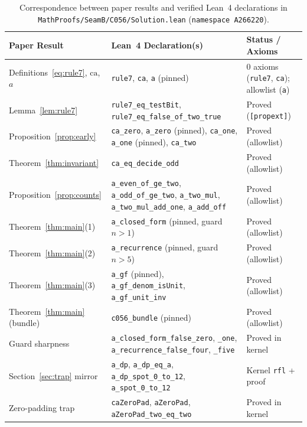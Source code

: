 \documentclass[11pt]{article}
\theoremstyle{definition}
\newcommand{\ca}{\mathrm{ca}}
\begin{document}
\begin{table}[ht]
\centering
\caption{Correspondence between paper results and verified Lean~4 declarations in \texttt{MathProofs/SeamB/C056/Solution.lean} (\texttt{namespace A266220}).}
\label{tab:lean-map}
\smallskip
{\small
\begin{tabular}{@{}l >{\raggedright\arraybackslash}p{6.5cm} >{\raggedright\arraybackslash}p{4.3cm}@{}}
\toprule
Paper Result & Lean~4 Declaration(s) & Status / Axioms \\
\midrule
Definitions~\eqref{eq:rule7}, $\ca$, $a$ & \texttt{rule7}, \texttt{ca}, \texttt{a} (pinned) & $0$ axioms (\texttt{rule7}, \texttt{ca}); allowlist (\texttt{a}) \\
Lemma~\ref{lem:rule7} & \texttt{rule7\_eq\_testBit}, \texttt{rule7\_eq\_false\_of\_two\_true} & Proved (\texttt{[propext]}) \\
Proposition~\ref{prop:early} & \texttt{ca\_zero}, \texttt{a\_zero} (pinned), \texttt{ca\_one}, \texttt{a\_one} (pinned), \texttt{ca\_two} & Proved (allowlist) \\
Theorem~\ref{thm:invariant} & \texttt{ca\_eq\_decide\_odd} & Proved (allowlist) \\
Proposition~\ref{prop:counts} & \texttt{a\_even\_of\_ge\_two}, \texttt{a\_odd\_of\_ge\_two}, \texttt{a\_two\_mul}, \texttt{a\_two\_mul\_add\_one}, \texttt{a\_add\_off} & Proved (allowlist) \\
Theorem~\ref{thm:main}(1) & \texttt{a\_closed\_form} (pinned, guard $n > 1$) & Proved (allowlist) \\
Theorem~\ref{thm:main}(2) & \texttt{a\_recurrence} (pinned, guard $n > 5$) & Proved (allowlist) \\
Theorem~\ref{thm:main}(3) & \texttt{a\_gf} (pinned), \texttt{a\_gf\_denom\_isUnit}, \texttt{a\_gf\_unit\_inv} & Proved (allowlist) \\
Theorem~\ref{thm:main} (bundle) & \texttt{c056\_bundle} (pinned) & Proved (allowlist) \\
Guard sharpness & \texttt{a\_closed\_form\_false\_zero}, \texttt{\_one}, \texttt{a\_recurrence\_false\_four}, \texttt{\_five} & Proved in kernel \\
Section~\ref{sec:trap} mirror & \texttt{a\_dp}, \texttt{a\_dp\_eq\_a}, \texttt{a\_dp\_spot\_0\_to\_12}, \texttt{a\_spot\_0\_to\_12} & Kernel \texttt{rfl} + proof \\
Zero-padding trap & \texttt{caZeroPad}, \texttt{aZeroPad}, \texttt{aZeroPad\_two\_eq\_two} & Proved in kernel \\
\bottomrule
\end{tabular}
}
\end{table}
\end{document}
